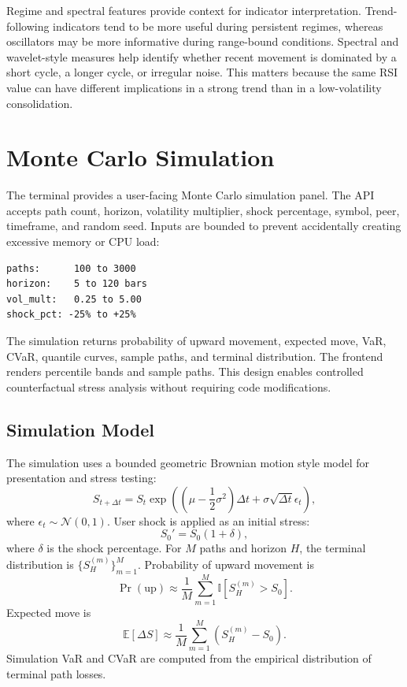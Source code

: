 \documentclass[conference]{IEEEtran}
\begin{document}
Regime and spectral features provide context for indicator interpretation.
Trend-following indicators tend to be more useful during persistent regimes,
whereas oscillators may be more informative during range-bound conditions.
Spectral and wavelet-style measures help identify whether recent movement is
dominated by a short cycle, a longer cycle, or irregular noise. This matters
because the same RSI value can have different implications in a strong trend
than in a low-volatility consolidation.

\section{Monte Carlo Simulation}

The terminal provides a user-facing Monte Carlo simulation panel. The API
accepts path count, horizon, volatility multiplier, shock percentage, symbol,
peer, timeframe, and random seed. Inputs are bounded to prevent accidentally
creating excessive memory or CPU load:

\begin{lstlisting}
paths:      100 to 3000
horizon:    5 to 120 bars
vol_mult:   0.25 to 5.00
shock_pct: -25% to +25%
\end{lstlisting}

The simulation returns probability of upward movement, expected move, VaR,
CVaR, quantile curves, sample paths, and terminal distribution. The frontend
renders percentile bands and sample paths. This design enables controlled
counterfactual stress analysis without requiring code modifications.

\subsection{Simulation Model}

The simulation uses a bounded geometric Brownian motion style model for
presentation and stress testing:
\begin{equation}
S_{t+\Delta t}=S_t
\exp\left((\mu-\frac{1}{2}\sigma^2)\Delta t+\sigma\sqrt{\Delta t}\epsilon_t\right),
\end{equation}
where $\epsilon_t\sim\mathcal{N}(0,1)$. User shock is applied as an initial
stress:
\begin{equation}
S_0' = S_0(1+\delta),
\end{equation}
where $\delta$ is the shock percentage. For $M$ paths and horizon $H$, the
terminal distribution is $\{S_H^{(m)}\}_{m=1}^{M}$. Probability of upward
movement is
\begin{equation}
\Pr(\text{up}) \approx \frac{1}{M}\sum_{m=1}^{M}
\mathbb{I}[S_H^{(m)}>S_0].
\end{equation}
Expected move is
\begin{equation}
\mathbb{E}[\Delta S] \approx \frac{1}{M}\sum_{m=1}^{M}(S_H^{(m)}-S_0).
\end{equation}
Simulation VaR and CVaR are computed from the empirical distribution of
terminal path losses.
\end{document}
